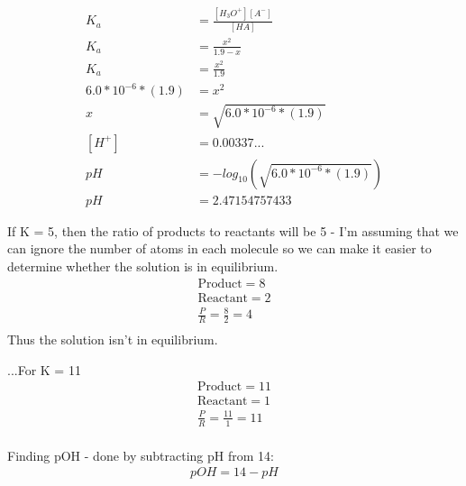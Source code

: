 \documentclass{article}  %
\begin{document}
\begin{equation*}
    \begin{aligned}
        K_a &= \frac{[H_3O^+][A^-]}{[HA]} \\
        K_a &= \frac{x^2}{1.9-x} \\
        K_a &= \frac{x^2}{1.9} \\
        6.0*10^{-6}*(1.9) &= x^2 \\
        x &= \sqrt{6.0*10^{-6}*(1.9)} \\
        [H^+] &= 0.00337... \\
        pH &= -log_{10}\left(\sqrt{6.0*10^{-6}*(1.9)}\right) \\
        pH &= 2.47154757433
    \end{aligned}
\end{equation*}

If K = 5, then the ratio of products to reactants will be 5 - I'm assuming that we can ignore the number of atoms in each molecule so we can make it easier to determine whether the solution is in equilibrium.
\begin{equation*}
    \begin{aligned}
        \text{Product} = 8 \\
        \text{Reactant} = 2 \\
        \frac{P}{R} = \frac{8}{2} = 4 \\
    \end{aligned}
\end{equation*}
Thus the solution isn't in equilibrium.

...For K = 11
\begin{equation*}
    \begin{aligned}
        \text{Product} = 11 \\
        \text{Reactant} = 1 \\
        \frac{P}{R} = \frac{11}{1} = 11 \\
    \end{aligned}
\end{equation*}

Finding pOH - done by subtracting pH from 14:
\begin{equation*}
    \begin{aligned}
        pOH = 14 - pH
    \end{aligned}
\end{equation*} 
\end{document}
